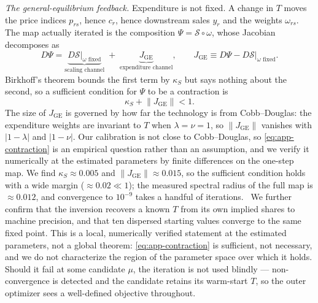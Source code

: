 \emph{The general-equilibrium feedback.} Expenditure is not fixed. A change in $T$ moves the
price indices $p_{rs}$, hence $c_{r}$, hence downstream sales $y_{r}$ and the weights
$\omega_{rs}$. The map actually iterated is the composition $\Psi=\mathcal{S}\circ\omega$, whose
Jacobian decomposes as
\begin{equation}
D\Psi = \underbrace{D\mathcal{S}\big|_{\omega\text{ fixed}}}_{\text{scaling channel}}
\;+\;\underbrace{J_{\mathrm{GE}}}_{\text{expenditure channel}},
\qquad
J_{\mathrm{GE}}\equiv D\Psi-D\mathcal{S}\big|_{\omega\text{ fixed}} .
\label{eq:app-jacobian-split}
\end{equation}
Birkhoff's theorem bounds the first term by $\kappa_{S}$ but says nothing about the second, so a
sufficient condition for $\Psi$ to be a contraction is
\begin{equation}
\kappa_{S}+\big\|J_{\mathrm{GE}}\big\|<1 .
\label{eq:app-contraction}
\end{equation}
The size of $J_{\mathrm{GE}}$ is governed by how far the technology is from Cobb--Douglas: the
expenditure weights are invariant to $T$ when $\lambda=\nu=1$, so $\|J_{\mathrm{GE}}\|$ vanishes
with $|1-\lambda|$ and $|1-\nu|$. Our calibration is not close to Cobb--Douglas, so
\eqref{eq:app-contraction} is an empirical question rather than an assumption, and we verify it
numerically at the estimated parameters by finite differences on the one-step map. We find
$\kappa_{S}\approx0.005$ and $\|J_{\mathrm{GE}}\|\approx0.015$, so the sufficient condition holds
with a wide margin ($\approx0.02\ll1$); the measured spectral radius of the full map is
$\approx0.012$, and convergence to $10^{-9}$ takes a handful of iterations.%
\ We further confirm that the inversion recovers a known $T$ from its own implied shares to
machine precision, and that ten dispersed starting values converge to the same fixed point. This
is a local, numerically verified statement at the estimated parameters, not a global theorem:
\eqref{eq:app-contraction} is sufficient, not necessary, and we do not characterize the region of
the parameter space over which it holds. Should it fail at some candidate $\mu$, the iteration is
not used blindly --- non-convergence is detected and the candidate retains its warm-start $T$, so
the outer optimizer sees a well-defined objective throughout.

